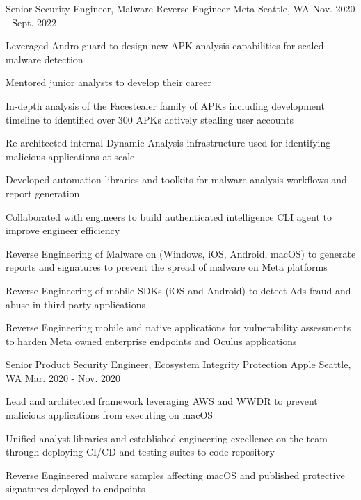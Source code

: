 \begin{cventries}
\cventry
{Senior Security Engineer, Malware Reverse Engineer} %
{Meta} %
{Seattle, WA} %
{Nov. 2020 - Sept. 2022} %
{ %
\begin{cvitems}
    \item {Leveraged Andro-guard to design new APK analysis capabilities for scaled malware detection}
    \item {Mentored junior analysts to develop their career}
    \item {In-depth analysis of the Facestealer family of APKs including development timeline to identified over 300 APKs actively stealing user accounts}
    \item {Re-architected internal Dynamic Analysis infrastructure used for identifying malicious applications at scale}
    \item {Developed automation libraries and toolkits for malware analysis workflows and report generation}
    \item {Collaborated with engineers to build authenticated intelligence CLI agent to improve engineer efficiency}
    \item {Reverse Engineering of Malware on (Windows, iOS, Android, macOS) to generate reports and signatures to prevent the spread of malware on Meta platforms}
    \item {Reverse Engineering of mobile SDKs (iOS and Android) to detect Ads fraud and abuse in third party applications}
    \item {Reverse Engineering mobile and native applications for vulnerability assessments to harden Meta owned enterprise endpoints and Oculus applications}
\end{cvitems}
}


\cventry
{Senior Product Security Engineer, Ecosystem Integrity Protection} %
{Apple} %
{Seattle, WA} %
{Mar. 2020 - Nov. 2020} %
{ %
\begin{cvitems}
    \item {Lead and architected framework leveraging AWS and WWDR to prevent malicious applications from executing on macOS}
    \item {Unified analyst libraries and established engineering excellence on the team through deploying CI/CD and testing suites to code repository}
    \item {Reverse Engineered malware samples affecting macOS and published protective signatures deployed to endpoints}
\end{cvitems}
}


\end{cventries}

